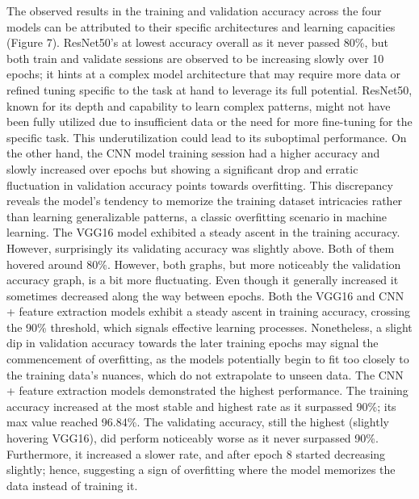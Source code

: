 \documentclass[10pt,twocolumn]{article}
\begin{document}
The observed results in the training and validation accuracy across the four models can be attributed to their specific architectures and learning capacities (Figure 7). 
ResNet50's at lowest accuracy overall as it never passed 80\%, but both train and validate sessions are observed to be increasing slowly over 10 epochs; it hints at a complex model architecture that may require more data or refined tuning specific to the task at hand to leverage its full potential. ResNet50, known for its depth and capability to learn complex patterns, might not have been fully utilized due to insufficient data or the need for more fine-tuning for the specific task. This underutilization could lead to its suboptimal performance. \newline
On the other hand, the CNN model training session had a higher accuracy and slowly increased over epochs but showing a significant drop and erratic fluctuation in validation accuracy points towards overfitting. This discrepancy reveals the model's tendency to memorize the training dataset intricacies rather than learning generalizable patterns, a classic overfitting scenario in machine learning. \newline
The VGG16 model exhibited a steady ascent in the training accuracy. However, surprisingly its validating accuracy was slightly above. Both of them hovered around 80\%. However, both graphs, but more noticeably the validation accuracy graph, is a bit more fluctuating. Even though it generally increased it sometimes decreased along the way between epochs. \newline
Both the VGG16 and CNN + feature extraction models exhibit a steady ascent in training accuracy, crossing the 90\% threshold, which signals effective learning processes. Nonetheless, a slight dip in validation accuracy towards the later training epochs may signal the commencement of overfitting, as the models potentially begin to fit too closely to the training data's nuances, which do not extrapolate to unseen data. \newline
The CNN + feature extraction models demonstrated the highest performance. The training accuracy increased at the most stable and highest rate as it surpassed 90\%; its max value reached 96.84\%. The validating accuracy, still the highest (slightly hovering VGG16), did perform noticeably worse as it never surpassed 90\%. Furthermore, it increased a slower rate, and after epoch 8 started decreasing slightly; hence, suggesting a sign of overfitting where the model memorizes the data instead of training it. \newline
\end{document}
